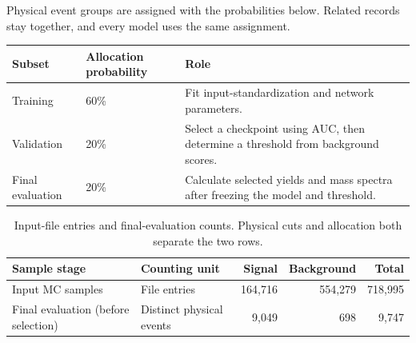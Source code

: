 \documentclass[11pt,a4paper]{article}
\begin{document}
Physical event groups are assigned with the probabilities below. Related records stay together, and every model uses the same assignment.
\begin{center}
\small
\begin{tabularx}{\linewidth}{@{}p{.18\linewidth}p{.19\linewidth}Y@{}}
\toprule
Subset & Allocation probability & Role \\
\midrule
Training & 60\% & Fit input-standardization and network parameters. \\
Validation & 20\% & Select a checkpoint using AUC, then determine a threshold from background scores. \\
Final evaluation & 20\% & Calculate selected yields and mass spectra after freezing the model and threshold. \\
\bottomrule
\end{tabularx}
\end{center}

\begin{table}[H]
\caption{Input-file entries and final-evaluation counts. Physical cuts and allocation both separate the two rows.}
\label{tab:population}
\centering\small
\begin{tabularx}{\linewidth}{@{}Y p{.23\linewidth} rrr@{}}
\toprule
Sample stage & Counting unit & Signal & Background & Total \\
\midrule
Input MC samples & File entries & 164,716 & 554,279 & 718,995 \\
Final evaluation (before selection) & Distinct physical events & 9,049 & 698 & 9,747 \\
\bottomrule
\end{tabularx}
\end{table}
\end{document}
